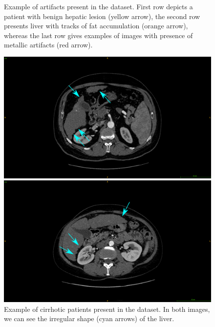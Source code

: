 \begin{figure}[!ht]
\begin{minipage}{0.45\linewidth}
	\end{minipage}
	\caption{Example of artifacts present in the \textbf{} dataset. First row depicts a patient with benign hepatic lesion (yellow arrow), the second row presents liver with tracks of fat accumulation (orange arrow), whereas the last row gives examples of images with presence of metallic artifacts (red arrow).}
	\label{fig:GDb_artifacts}
\end{figure}
\begin{figure}[!ht]
	\centering
	\begin{minipage}{0.45\linewidth}
		\includegraphics[width=\linewidth]{../Contributions/images/ResizeGDB_cirrhoticPatientArrows}
	\end{minipage} \hspace{-0.1cm}
	\begin{minipage}{0.45\linewidth}
		\includegraphics[width=\linewidth]{../Contributions/images/ResizeGDB_cirrhoticPatientArrows_2}
	\end{minipage}
	\caption{Example of cirrhotic patients present in the \textbf{} dataset. In both images, we can see the irregular shape (cyan arrows) of the liver.}
	\label{fig:GDb_diseasedLivers}
\end{figure}
